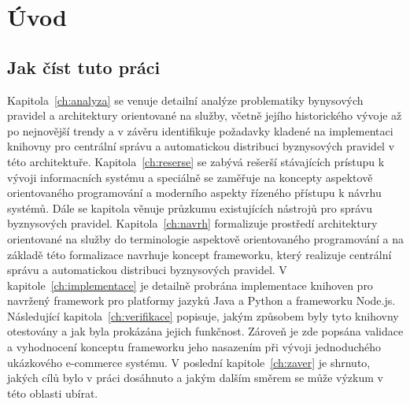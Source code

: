 

\chapter{Úvod}\label{ch:uvod}


\section{Jak číst tuto práci}

Kapitola~\ref{ch:analyza} se venuje detailní analýze problematiky bynysových pravidel a
architektury orientované na služby, včetně jejího historického vývoje až po nejnovější trendy
a v závěru identifikuje požadavky kladené na implementaci knihovny pro centrální správu a
automatickou distribuci byznysových pravidel v této architektuře. Kapitola~\ref{ch:reserse}
se zabývá rešerší stávajících prístupu k vývoji informacních systému a speciálně se zaměřuje
na koncepty aspektově orientovaného programování a moderního aspekty řízeného přístupu k návrhu
systémů. Dále se kapitola věnuje průzkumu existujících nástrojů pro správu byznysových pravidel.
Kapitola~\ref{ch:navrh} formalizuje prostředí architektury orientované na služby do terminologie
aspektově orientovaného programování a na základě této formalizace navrhuje koncept frameworku,
který realizuje centrální správu a automatickou distribuci byznysových pravidel.
V kapitole~\ref{ch:implementace} je detailně probrána implementace knihoven pro navržený framework
pro platformy jazyků Java a Python a frameworku Node.js. Následující kapitola~\ref{ch:verifikace}
popisuje, jakým způsobem byly tyto knihovny otestovány a jak byla prokázána jejich funkčnost. Zároveň
je zde popsána validace a vyhodnocení konceptu frameworku jeho nasazením při vývoji
jednoduchého ukázkového e-commerce systému. V poslední kapitole~\ref{ch:zaver} je shrnuto, jakých
cílů bylo v práci dosáhnuto a jakým dalším směrem se může výzkum v této oblasti ubírat.
